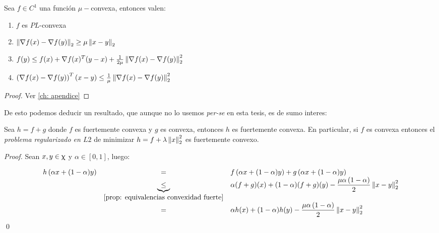 \begin{proposition}
	\label{prop: implicancias de convexidad fuerte}
	Sea $f \in C^1$ una funci\'on $\mu-$convexa, entonces valen:
	
	\begin{enumerate}
		\item $f$ es $PL$-convexa
		\item $\left\lVert\nabla f(x) - \nabla f(y)\right\rVert_2 \geq \mu \left\lVert x-y\right\rVert_2$
		\item $f(y) \leq f(x) + \nabla f(x)^T (y-x) + \frac{1}{2 \mu} \left\lVert\nabla f(x) - \nabla f(y)\right\rVert_2^2$
		\item $ \left(\nabla f(x) - \nabla f(y)\right)^T (x-y) \leq \frac{1}{\mu} \left\lVert\nabla f(x) - \nabla f(y)\right\rVert_2^2$
	\end{enumerate}
	
\end{proposition}

\begin{proof}
	Ver \ref{ch: apendice}
\end{proof}

De esto podemos deducir un resultado, que aunque no lo usemos \textit{per-se} en esta tesis, es de sumo interes:

\begin{corollary}
	Sea $h = f+g$ donde $f$ es fuertemente convexa y $g$ es convexa, entonces $h$ es fuertemente convexa. En particular, si $f$ es convexa entonces el \textit{problema regularizado en $L2$} de minimizar $h = f + \lambda \left\lVert x\right\rVert_2^2$ es fuertemente convexo.
\end{corollary}

\begin{proof}
	Sean $x,y \in \upchi$ y $\alpha \in [0,1]$, luego:
	
	\begin{equation*}
	\begin{array}{rcl}
		h\left(\alpha x + (1-\alpha)y\right) & = & f\left(\alpha x + (1-\alpha)y\right)  + g\left(\alpha x + (1-\alpha)y\right)  \\
		& \underbrace{\leq}_{\ref{prop: equivalencias convexidad fuerte}} & \alpha(f + g)(x) + (1-\alpha)(f+g)(y) - \dfrac{\mu \alpha \left(1-\alpha\right)}{2} \left\lVert x-y\right\rVert^2_2 \\
		& = & \alpha h(x) + (1-\alpha)h(y) - \dfrac{\mu \alpha \left(1-\alpha\right)}{2} \left\lVert x-y\right\rVert^2_2 
	\end{array}
	\end{equation*}\qed
	
\end{proof}

